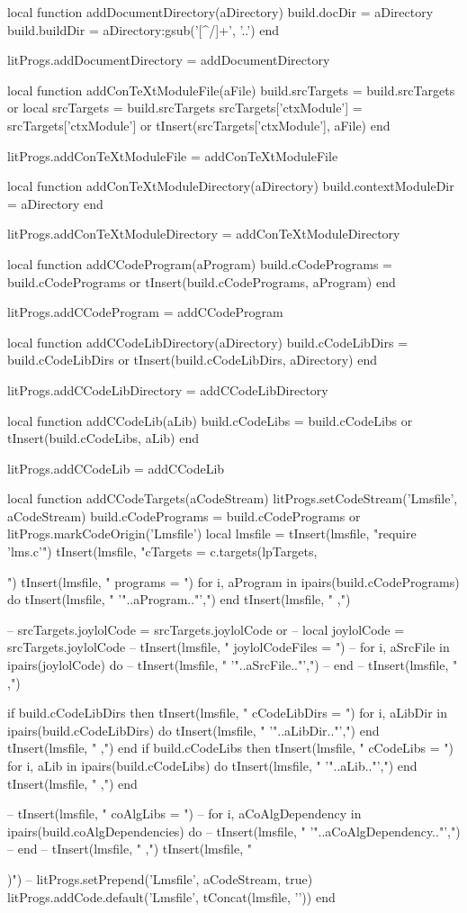 local function addDocumentDirectory(aDirectory)
  build.docDir   = aDirectory
  build.buildDir = aDirectory:gsub('[^/]+', '..')
end

litProgs.addDocumentDirectory = addDocumentDirectory

local function addConTeXtModuleFile(aFile)
  build.srcTargets = build.srcTargets or { }
  local srcTargets = build.srcTargets
  srcTargets['ctxModule'] = srcTargets['ctxModule'] or { }
  tInsert(srcTargets['ctxModule'], aFile)
end

litProgs.addConTeXtModuleFile = addConTeXtModuleFile

local function addConTeXtModuleDirectory(aDirectory)
  build.contextModuleDir = aDirectory
end

litProgs.addConTeXtModuleDirectory = addConTeXtModuleDirectory

local function addCCodeProgram(aProgram)
  build.cCodePrograms = build.cCodePrograms or { }
  tInsert(build.cCodePrograms, aProgram)
end

litProgs.addCCodeProgram = addCCodeProgram

local function addCCodeLibDirectory(aDirectory)
  build.cCodeLibDirs = build.cCodeLibDirs or { }
  tInsert(build.cCodeLibDirs, aDirectory)
end

litProgs.addCCodeLibDirectory = addCCodeLibDirectory

local function addCCodeLib(aLib)
  build.cCodeLibs = build.cCodeLibs or { }
  tInsert(build.cCodeLibs, aLib)
end

litProgs.addCCodeLib = addCCodeLib

local function addCCodeTargets(aCodeStream)
  litProgs.setCodeStream('Lmsfile', aCodeStream)
  build.cCodePrograms = build.cCodePrograms or { }
  litProgs.markCodeOrigin('Lmsfile')
  local lmsfile = {}
  tInsert(lmsfile, "require 'lms.c'\n")
  tInsert(lmsfile, "cTargets = c.targets(lpTargets, {")
  tInsert(lmsfile, "  programs = {")
  for i, aProgram in ipairs(build.cCodePrograms) do
    tInsert(lmsfile, "    '"..aProgram.."',")
  end
  tInsert(lmsfile, "  },")

--  srcTargets.joylolCode = srcTargets.joylolCode or { }
--  local joylolCode      = srcTargets.joylolCode
--  tInsert(lmsfile, "  joylolCodeFiles = {")
--  for i, aSrcFile in ipairs(joylolCode) do
--    tInsert(lmsfile, "    '"..aSrcFile.."',")
--  end
--  tInsert(lmsfile, "  },")

  if build.cCodeLibDirs then 
    tInsert(lmsfile, "  cCodeLibDirs = {")
    for i, aLibDir in ipairs(build.cCodeLibDirs) do
      tInsert(lmsfile, "    '"..aLibDir.."',")
    end
    tInsert(lmsfile, "  },")
  end
  if build.cCodeLibs then 
    tInsert(lmsfile, "  cCodeLibs = {")
    for i, aLib in ipairs(build.cCodeLibs) do
      tInsert(lmsfile, "    '"..aLib.."',")
    end
    tInsert(lmsfile, "  },")
  end

--  tInsert(lmsfile, "  coAlgLibs = {")
--  for i, aCoAlgDependency in ipairs(build.coAlgDependencies) do
--    tInsert(lmsfile, "    '"..aCoAlgDependency.."',")
--  end
--  tInsert(lmsfile, "  },")
  tInsert(lmsfile, "})")
--  litProgs.setPrepend('Lmsfile', aCodeStream, true)
  litProgs.addCode.default('Lmsfile', tConcat(lmsfile, '\n'))
end

